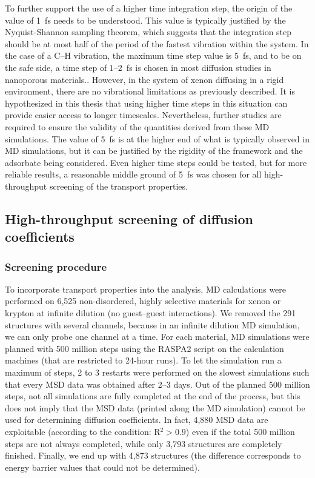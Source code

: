 \documentclass[main]{subfiles}
\begin{document}
To further support the use of a higher time integration step, the origin of the value of \SI{1}{\fs} needs to be understood. This value is typically justified by the Nyquist-Shannon sampling theorem, which suggests that the integration step should be at most half of the period of the fastest vibration within the system. In the case of a C--H vibration, the maximum time step value is \SI{5}{\fs}, and to be on the safe side, a time step of $1$--$2$~\si{\fs} is chosen in most diffusion studies in nanoporous materials.\autocite{Bukowski_2021}. However, in the system of xenon diffusing in a rigid environment, there are no vibrational limitations as previously described. It is hypothesized in this thesis that using higher time steps in this situation can provide easier access to longer timescales. Nevertheless, further studies are required to ensure the validity of the quantities derived from these MD simulations. The value of \SI{5}{\fs} is at the higher end of what is typically observed in MD simulations, but it can be justified by the rigidity of the framework and the adsorbate being considered. Even higher time steps could be tested, but for more reliable results, a reasonable middle ground of \SI{5}{\fs} was chosen for all high-throughput screening of the transport properties.

\subsection{High-throughput screening of diffusion coefficients}

\subsubsection{Screening procedure}

To incorporate transport properties into the analysis, MD calculations were performed on 6,525 non-disordered, highly selective materials for xenon or krypton at infinite dilution (no guest--guest interactions). We removed the 291 structures with several channels, because in an infinite dilution MD simulation, we can only probe one channel at a time. For each material, MD simulations were planned with 500 million steps using the RASPA2 script on the calculation machines (that are restricted to 24-hour runs). To let the simulation run a maximum of steps, 2 to 3 restarts were performed on the slowest simulations such that every MSD data was obtained after 2--3 days. Out of the planned 500 million steps, not all simulations are fully completed at the end of the process, but this does not imply that the MSD data (printed along the MD simulation) cannot be used for determining diffusion coefficients. In fact, 4,880 MSD data are exploitable (according to the condition: R$^2>0.9$) even if the total 500 million steps are not always completed, while only 3,793 structures are completely finished. Finally, we end up with 4,873 structures (the difference corresponds to energy barrier values that could not be determined).
\end{document}
